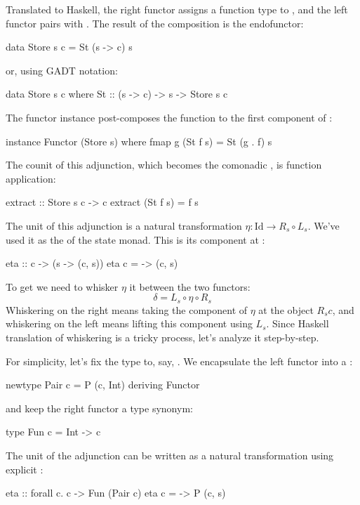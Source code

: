 \documentclass[DaoFP]{subfiles}
\begin{document}
Translated to Haskell, the right functor assigns a function type  to , and the left functor pairs  with . The result of the composition is the endofunctor:
\begin{haskell}
data Store s c = St (s -> c) s
\end{haskell}
or, using GADT notation:
\begin{haskell}
data Store s c where
    St :: (s -> c) -> s -> Store s c
\end{haskell}
The functor instance post-composes the function to the first component of  :
\begin{haskell}
instance Functor (Store s) where
  fmap g (St f s) = St (g . f) s
\end{haskell}

The counit of this adjunction, which becomes the comonadic , is function application:
\begin{haskell}
extract :: Store s c -> c
extract (St f s) = f s
\end{haskell}
The unit of this adjunction is a natural transformation $\eta \colon \text{Id} \to R_s \circ L_s$. We've used it as the  of the state monad. This is its component at :
\begin{haskell}
eta :: c -> (s -> (c, s))
eta c = \s -> (c, s)
\end{haskell}
To get  we need to whisker $\eta$ it between the two functors:
\[ \delta = L_s  \circ \eta \circ R_s \]
Whiskering on the right means taking the component of $\eta$ at the object $R_s c$, and whiskering on the left means lifting this component using $L_s$. Since Haskell translation of whiskering is a tricky process, let's analyze it step-by-step. 

For simplicity, let's fix the type  to, say, . We encapsulate the left functor into a :
\begin{haskell}
newtype Pair c = P (c, Int)
  deriving Functor
\end{haskell}
and keep the right functor a type synonym:
\begin{haskell}
type Fun c = Int -> c
\end{haskell}
The unit of the adjunction can be written as a natural transformation using explicit :
\begin{haskell}
eta :: forall c. c -> Fun (Pair c)
eta c = \s -> P (c, s)
\end{haskell}
\end{document}
